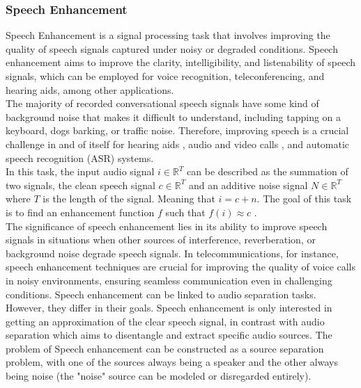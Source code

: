 \subsubsection{Speech Enhancement}
Speech Enhancement is a signal processing task that involves improving the quality of speech signals captured under noisy or degraded conditions. Speech enhancement aims to improve the clarity, intelligibility, and listenability of speech signals, which can be employed for voice recognition, teleconferencing, and hearing aids, among other applications.\\ 
The majority of recorded conversational speech signals have some kind of background noise that makes it difficult to understand, including tapping on a keyboard, dogs barking, or traffic noise. Therefore, improving speech is a crucial challenge in and of itself for hearing aids \cite{reddy2018}, audio and video calls \cite{reddy2019}, and automatic speech recognition (ASR) systems.\\
In this task, the input audio signal $i \in \mathbb{R}^T$ can be described as the summation of two signals, the clean speech signal $c \in \mathbb{R}^T$ and an additive noise signal $N \in \mathbb{R}^T$ where $T$ is the length of the signal. Meaning that $i=c+n$. The goal of this task is to find an enhancement function $f$ such that $f(i) \approx c$ \cite{defossez2020}.\\
The significance of speech enhancement lies in its ability to improve speech signals in situations when other sources of interference, reverberation, or background noise degrade speech signals. In telecommunications, for instance, speech enhancement techniques are crucial for improving the quality of voice calls in noisy environments, ensuring seamless communication even in challenging conditions.
Speech enhancement can be linked to audio separation tasks. However, they differ in their goals. Speech enhancement is only interested in getting an approximation of the clear speech signal, in contrast with audio separation which aims to disentangle and extract specific audio sources. The problem of Speech enhancement can be constructed as a source separation problem, with one of the sources always being a speaker and the other always being noise (the "noise" source can be modeled or disregarded entirely).

